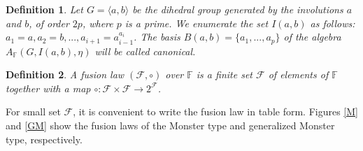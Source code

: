 \documentclass[12pt]{article}
\newcommand\F{\mathbb{F}}
\newcommand\cF{\mathcal{F}}
\newtheorem{defi}{Definition}
\begin{document}
	\begin{defi} 
	Let $G=\langle a,b\rangle$ be the dihedral group generated by the involutions $a$ and $b$, of order $2p$, where $p$ is a prime. We enumerate the set $I(a,b)$ as follows: $a_1=a, a_2=b,..., a_{i+1}=a_{i-1}^{a_{i}}$. The basis $B(a,b)=\{a_1,...,a_p\}$ of the algebra $A_{\F}(G,I(a,b),\eta)$ will be called canonical.
	\end{defi}
	
	
	\begin{defi}
	A \emph{fusion law} $(\cF,\circ)$ over $\F$ is a finite set $\mathcal{F}$ of elements of $\F$ together
	with a map $\circ: \mathcal{F} \times \mathcal{F} \to 2^{\mathcal{F}}$. 
	\end{defi}
For small set $\mathcal{F}$, it is convenient to write the fusion law in table form. Figures \ref{M} and \ref{GM} show the fusion laws of the Monster type and generalized Monster type, respectively.
\end{document}
